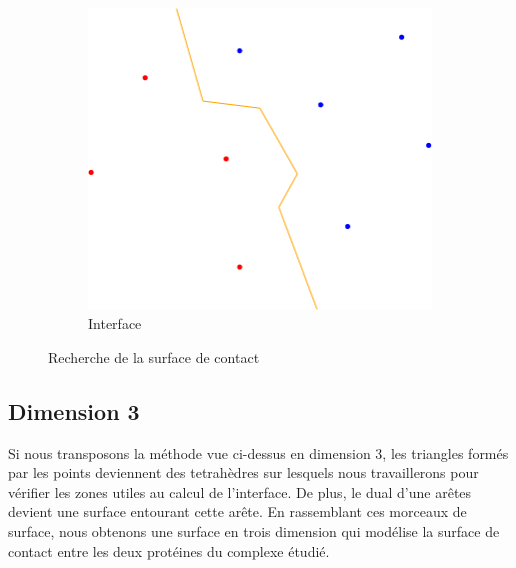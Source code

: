 \begin{figure}[ht]
\begin{subfigure}{0.45\textwidth}
  \includegraphics[width=\textwidth]{figures/process_d_4.png}
  \caption{Interface}
  \label{fig::process_d_4}
\end{subfigure}
\caption{Recherche de la surface de contact}
\label{fig::delaunays_process_2}
\end{figure}


\subsection{Dimension 3}

Si nous transposons la méthode vue ci-dessus en dimension 3, les triangles formés
par les points deviennent des tetrahèdres sur lesquels nous travaillerons pour vérifier
les zones utiles au calcul de l'interface.
De plus, le dual d'une arêtes devient une surface entourant cette arête. En rassemblant ces morceaux
de surface, nous obtenons une surface en trois dimension qui modélise la surface
de contact entre les deux protéines du complexe étudié.

